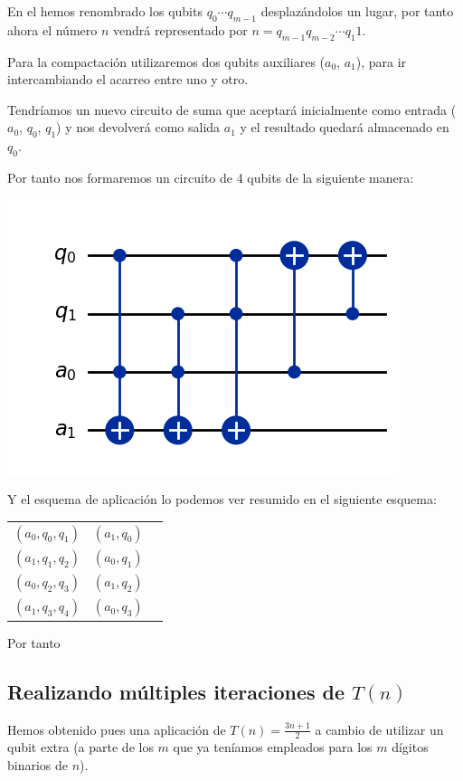 En el hemos renombrado los qubits $q_0 \cdots q_{m-1}$ desplazándolos un lugar, por tanto ahora el número $n$ vendrá representado por $n=q_{m-1} q_{m-2} \cdots q_1 1$.

Para la compactación utilizaremos dos qubits auxiliares ($a_0$, $a_1$), para ir intercambiando el acarreo entre uno y otro.

Tendríamos un nuevo circuito de suma que aceptará inicialmente como entrada ($a_0$, $q_0$, $q_1$) y nos devolverá como salida $a_1$ y el resultado quedará almacenado en $q_0$.

Por tanto nos formaremos un circuito de 4 qubits de la siguiente manera:

\begin{center}
    \includegraphics[width=0.5\linewidth]{CircuitoSuma2DigitosConAcarreoCompacto.png}
    \label{fig:CircuitoSuma2DigitosConAcarreoCompacto}
\end{center}

Y el esquema de aplicación lo podemos ver resumido en el siguiente esquema:

\begin{center}
    \begin{tabular}{|c|c|c|}
        $(a_0, q_0, q_1)$   &   $(a_1, q_0)$    \\
        $(a_1, q_1, q_2)$   &   $(a_0, q_1)$    \\
        $(a_0, q_2, q_3)$   &   $(a_1, q_2)$    \\
        $(a_1, q_3, q_4)$   &   $(a_0, q_3)$    \\
    \end{tabular}
\end{center}


Por tanto 


\subsection{Realizando múltiples iteraciones de $T(n)$}


Hemos obtenido pues una aplicación de $T(n) = \frac{3n+1}{2}$ a cambio de utilizar un qubit extra (a parte de los $m$ que ya teníamos empleados para los $m$ dígitos binarios de $n$).

